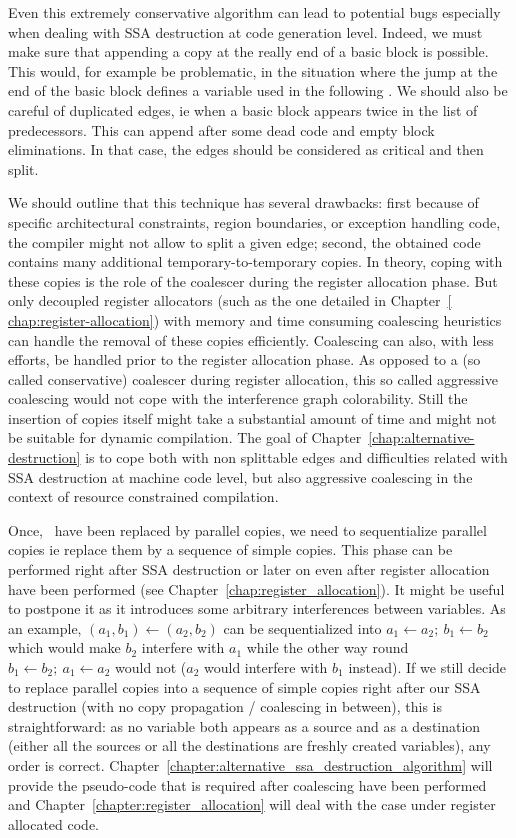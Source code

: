 Even this extremely conservative algorithm can lead to potential bugs especially when dealing with SSA destruction at code generation level. Indeed, we must make sure that appending a copy at the really end of a basic block is possible. This would, for example be problematic, in the situation where the jump at the end of the basic block defines a variable used in the following \phiop. We should also be careful of duplicated edges, ie when a basic block appears twice in the list of predecessors. This can append after some dead code and empty block eliminations. In that case, the edges should be considered as critical and then split.

We should outline that this technique has several drawbacks: first because of specific architectural constraints, region boundaries, or exception handling code, the compiler might not allow to split a given edge; second, the obtained code contains many additional temporary-to-temporary copies. In theory, coping with these copies is the role of the coalescer during the register allocation phase. But only decoupled register allocators (such as the one detailed in Chapter~\ref{ chap:register-allocation}) with memory and time consuming coalescing heuristics can handle the removal of these copies efficiently. Coalescing can also, with less efforts, be handled prior to the register allocation phase. As opposed to a (so called conservative) coalescer during register allocation, this so called aggressive coalescing would not cope with the interference graph colorability. Still the insertion of copies itself might take a substantial amount of time and might not be suitable for dynamic compilation. The goal of Chapter~\ref{chap:alternative-destruction} is to cope both with non splittable edges and difficulties related with SSA destruction at machine code level, but also aggressive coalescing in the context of resource constrained compilation.

Once, \phiops\ have been replaced by parallel copies, we need to sequentialize parallel copies ie replace them by a sequence of simple copies. This phase can be performed right after SSA destruction or later on even after register allocation have been performed (see Chapter~\ref{chap:register_allocation}). It might be useful to postpone it as it introduces some arbitrary interferences between variables. As an example, $(a_1,b_1)\gets (a_2,b_2)$ can be sequentialized into $a_1\gets a_2;\ b_1\gets b_2$ which would make $b_2$ interfere with $a_1$ while the other way round $b_1\gets b_2;\ a_1\gets a_2$ would not ($a_2$ would interfere with $b_1$ instead).
If we still decide to replace parallel copies into a sequence of simple copies right after our SSA destruction (with no copy propagation / coalescing in between), this is straightforward: as no variable both appears as a source and as a destination (either all the sources or all the destinations are freshly created variables), any order is correct. Chapter~\ref{chapter:alternative_ssa_destruction_algorithm} will provide the pseudo-code that is required after coalescing have been performed and Chapter~\ref{chapter:register_allocation} will deal with the case under register allocated code.

